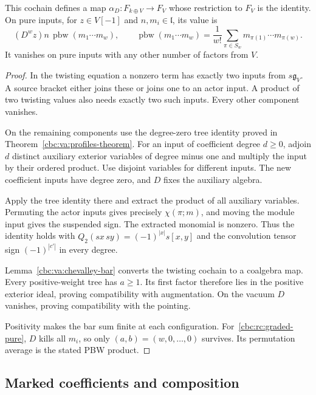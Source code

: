 \begin{lemma}\label{cbc:rc:graded-action}
This cochain defines a map $\alpha_D:F_{k\oplus V}\to F_V$
whose restriction to $F_V$ is the identity.
On pure inputs, for $z\in V[-1]$ and $n,m_i\in\mathfrak l$,
its value is
\begin{equation}\label{cbc:rc:graded-pure}
 (D^wz)n\,\operatorname{pbw}(m_1\cdots m_w),
 \qquad
 \operatorname{pbw}(m_1\cdots m_w)=
 \frac1{w!}\sum_{\pi\in S_w}m_{\pi(1)}\cdots m_{\pi(w)}.
\end{equation}
It vanishes on pure inputs with any other number of
factors from $V$.
\end{lemma}
\begin{proof}
In the twisting equation a nonzero term has exactly two
inputs from $s\mathfrak g_V$. A source bracket either
joins these or joins one to an actor input. A product
of two twisting values also needs exactly two such
inputs. Every other component vanishes.

On the remaining components use the degree-zero tree
identity proved in Theorem~\ref{cbc:va:profiles-theorem}.
For an input of coefficient degree $d\geq0$, adjoin
$d$ distinct auxiliary exterior variables of degree
minus one and multiply the input by their ordered
product. Use disjoint variables for different inputs.
The new coefficient inputs have degree zero, and $D$
fixes the auxiliary algebra.

Apply the tree identity
there and extract the product of all auxiliary
variables. Permuting the actor inputs gives precisely
$\chi(\pi;m)$, and moving the module input gives
the suspended sign. The extracted monomial is nonzero.
Thus the identity holds with
$Q_2(sx\,sy)=(-1)^{|x|}s[x,y]$ and the convolution
tensor sign $(-1)^{|c'|}$ in every degree.

Lemma~\ref{cbc:va:chevalley-bar} converts the twisting
cochain to a coalgebra map. Every positive-weight
tree has $a\geq1$. Its first factor therefore lies
in the positive exterior ideal, proving compatibility
with augmentation. On the vacuum $D$ vanishes, proving
compatibility with the pointing.

Positivity makes
the bar sum finite at each configuration.
For~\eqref{cbc:rc:graded-pure}, $D$ kills all $m_i$,
so only $(a,b)=(w,0,\ldots,0)$ survives. Its permutation
average is the stated PBW product.
\end{proof}

\subsection{Marked coefficients and composition}


